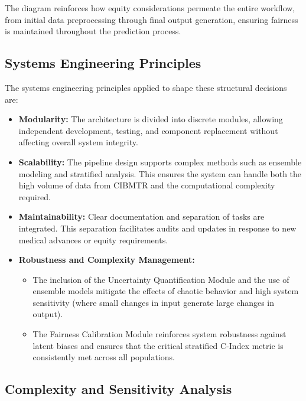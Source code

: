 The diagram reinforces how equity considerations permeate the entire workflow, from initial data preprocessing through final output generation, ensuring fairness is maintained throughout the prediction process.

\subsection{Systems Engineering Principles}

The systems engineering principles applied to shape these structural decisions are:

\begin{itemize}
    \item \textbf{Modularity:} The architecture is divided into discrete modules, allowing independent development, testing, and component replacement without affecting overall system integrity.
    
    \item \textbf{Scalability:} The pipeline design supports complex methods such as ensemble modeling and stratified analysis. This ensures the system can handle both the high volume of data from CIBMTR and the computational complexity required.
    
    \item \textbf{Maintainability:} Clear documentation and separation of tasks are integrated. This separation facilitates audits and updates in response to new medical advances or equity requirements.
    
    \item \textbf{Robustness and Complexity Management:} 
    \begin{itemize}
        \item The inclusion of the Uncertainty Quantification Module and the use of ensemble models mitigate the effects of chaotic behavior and high system sensitivity (where small changes in input generate large changes in output).
        \item The Fairness Calibration Module reinforces system robustness against latent biases and ensures that the critical stratified C-Index metric is consistently met across all populations.
    \end{itemize}
\end{itemize}

\subsection{Complexity and Sensitivity Analysis}

